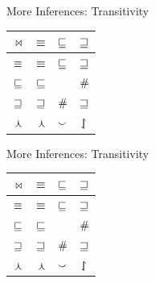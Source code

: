 

	
\def\title{More Inferences: Transitivity}
\begin{frame}{\title}
\begin{center}
	\begin{tabular}{|c||c|c|c|}
    \hline
    $\bowtie$ & $\equiv$ & $\forward$ & $\sqsupseteq$ \\
    \hline
    $\equiv$ & $\equiv$ & $\forward$ & $\sqsupseteq$ \\
    $\forward$ & $\forward$ & \noncircled{$\forward$} & $\#$  \\
    $\sqsupseteq$ & $\sqsupseteq$ & $\#$ & $\sqsupseteq$  \\
    $\curlywedge$ & $\curlywedge$ & $\smallsmile$ & $\downharpoonleft\hspace{-1.25mm}\upharpoonright$   \\
    \hline
	\end{tabular}
\end{center}
\end{frame}

\begin{frame}[noframenumbering]{\title}
\begin{center}
	\begin{tabular}{|c||c|c|c|}
    \hline
    $\bowtie$ & $\equiv$ & $\forward$ & $\sqsupseteq$ \\
    \hline
    $\equiv$ & $\equiv$ & $\forward$ & $\sqsupseteq$ \\
    $\forward$ & $\forward$ & \circled{$\forward$} & $\#$  \\
    $\sqsupseteq$ & $\sqsupseteq$ & $\#$ & $\sqsupseteq$  \\
    $\curlywedge$ & $\curlywedge$ & $\smallsmile$ & $\downharpoonleft\hspace{-1.25mm}\upharpoonright$   \\
    \hline
	\end{tabular}
\end{center}
\end{frame}

